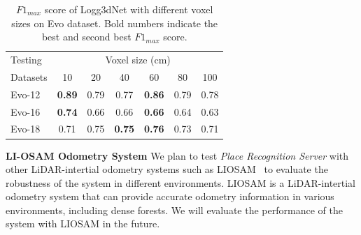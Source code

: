 \begin{table}[htbp]
  \centering
  \begin{tabular}{p{2cm} *{6}{c}}
      \toprule
      \multicolumn{1}{l}{Testing} & \multicolumn{6}{c}{Voxel size (cm)} \\
      \cmidrule{2-7}
      \multicolumn{1}{l}{Datasets} & 10 & 20 & 40 & 60 & 80 & 100 \\
      \midrule
      Evo-12 &\textbf{0.89} &0.79 &0.77 &\textbf{0.86} &0.79 &0.78 \\
      \addlinespace %
      Evo-16 & \textbf{0.74} & 0.66 & 0.66 & \textbf{0.66} & 0.64 & 0.63 \\
      \addlinespace %
      Evo-18  &0.71 & 0.75 & \textbf{0.75} & \textbf{0.76} & 0.73 & 0.71 \\
      \bottomrule
  \end{tabular}

  \caption{$F{1}_{max}$ score of Logg3dNet with different voxel sizes on Evo dataset. Bold numbers indicate the best and second best $F{1}_{max}$ score.}
  \label{tab:voxel_size}
\end{table}

  
\textbf{LI-OSAM Odometry System}\hspace{0.5em} We plan to test \emph{Place Recognition Server} with other LiDAR-intertial odometry systems such as LIOSAM~\cite{shan2020iros} to evaluate the robustness of the system in different environments. LIOSAM is a LiDAR-intertial odometry system that can provide accurate odometry information in various environments, including dense forests. We will evaluate the performance of the system with LIOSAM in the future.

